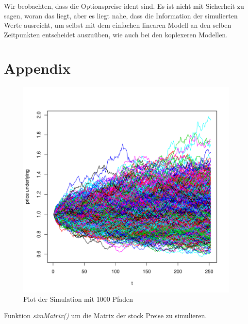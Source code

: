 \documentclass[10pt,a4paper]{report}\usepackage[]{graphicx}\usepackage[]{color}
\makeatletter
\def\maxwidth{ %
  \ifdim\Gin@nat@width>\linewidth
    \linewidth
  \else
    \Gin@nat@width
  \fi
}
\makeatother
\begin{document}
Wir beobachten, dass die Optionspreise ident sind. Es ist nicht mit Sicherheit zu sagen, woran das liegt, aber es liegt nahe, dass die Information der simulierten Werte ausreicht, um selbst mit dem einfachen linearen Modell an den selben Zeitpunkten entscheidet auszuüben, wie auch bei den koplexeren Modellen.





\appendix

\chapter*{Appendix}

\begin{figure}[H]

\includegraphics[width=\maxwidth]{figure/unnamed-chunk-20-1} 

\caption{Plot der Simulation mit 1000 Pfaden}
\label{100P}
\end{figure}

Funktion \textit{simMatrix()} um die Matrix der stock Preise zu simulieren.
\end{document}
